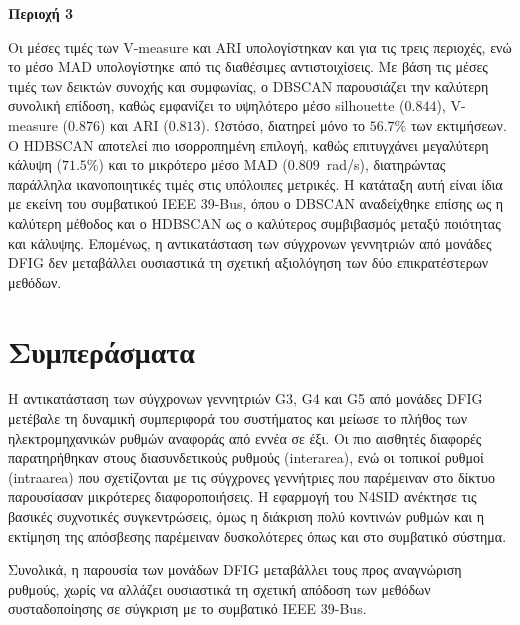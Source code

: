 \begin{table}[htbp]
    \vspace{0.8em}
    \textbf{Περιοχή 3}\\[0.3em]
\end{table}

Οι μέσες τιμές των V-measure και ARI υπολογίστηκαν και για τις τρεις περιοχές, ενώ το μέσο MAD υπολογίστηκε από τις διαθέσιμες αντιστοιχίσεις. Με βάση τις μέσες τιμές των δεικτών συνοχής και συμφωνίας, ο DBSCAN παρουσιάζει την καλύτερη συνολική επίδοση, καθώς εμφανίζει το υψηλότερο μέσο silhouette ($0.844$), V-measure ($0.876$) και ARI ($0.813$). Ωστόσο, διατηρεί μόνο το $56.7\%$ των εκτιμήσεων. Ο HDBSCAN αποτελεί πιο ισορροπημένη επιλογή, καθώς επιτυγχάνει μεγαλύτερη κάλυψη ($71.5\%$) και το μικρότερο μέσο MAD ($0.809$~rad/s), διατηρώντας παράλληλα ικανοποιητικές τιμές στις υπόλοιπες μετρικές. Η κατάταξη αυτή είναι ίδια με εκείνη του συμβατικού IEEE 39-Bus, όπου ο DBSCAN αναδείχθηκε επίσης ως η καλύτερη μέθοδος και ο HDBSCAN ως ο καλύτερος συμβιβασμός μεταξύ ποιότητας και κάλυψης. Επομένως, η αντικατάσταση των σύγχρονων γεννητριών από μονάδες DFIG δεν μεταβάλλει ουσιαστικά τη σχετική αξιολόγηση των δύο επικρατέστερων μεθόδων.

\section{Συμπεράσματα}
Η αντικατάσταση των σύγχρονων γεννητριών G3, G4 και G5 από μονάδες DFIG μετέβαλε τη δυναμική συμπεριφορά του συστήματος και μείωσε το πλήθος των ηλεκτρομηχανικών ρυθμών αναφοράς από εννέα σε έξι. Οι πιο αισθητές διαφορές παρατηρήθηκαν στους διασυνδετικούς ρυθμούς (inter\textendash{}area), ενώ οι τοπικοί ρυθμοί (intra\textendash{}area) που σχετίζονται με τις σύγχρονες γεννήτριες που παρέμειναν στο δίκτυο παρουσίασαν μικρότερες διαφοροποιήσεις. Η εφαρμογή του N4SID ανέκτησε τις βασικές συχνοτικές συγκεντρώσεις, όμως η διάκριση πολύ κοντινών ρυθμών και η εκτίμηση της απόσβεσης παρέμειναν δυσκολότερες όπως και στο συμβατικό σύστημα.

Συνολικά, η παρουσία των μονάδων DFIG μεταβάλλει τους προς αναγνώριση ρυθμούς, χωρίς να αλλάζει ουσιαστικά τη σχετική απόδοση των μεθόδων συσταδοποίησης σε σύγκριση με το συμβατικό IEEE 39-Bus.
